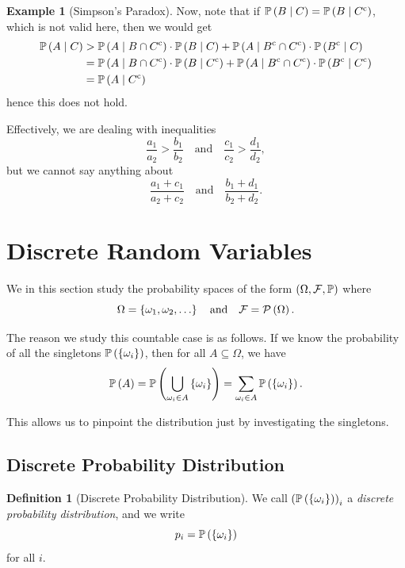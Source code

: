 \documentclass{article}
\theoremstyle{definition}
\newtheorem{definition}[theorem]{Definition}
\newtheorem{example}[theorem]{Example}
\theoremstyle{remark}
\newcommand{\Prob}{\mathbb{P}}
\newcommand{\eventSpace}{\mathcal{F}}
\newcommand{\powerset}{\mathcal{P}}
\newcommand{\Conditional}[2]{#1\mid #2}
\newcommand{\compl}{^{\mathrm{c}}}
\newcommand{\qand}{\quad\text{and}\quad}
\begin{document}
\begin{example}[Simpson's Paradox]
    Now, note that if \(\Prob\pqty{\Conditional{B}{C}} = \Prob\pqty{\Conditional{B}{C\compl}}\), which is not valid here, then we would get
    \begin{align*}
        \Prob\pqty{\Conditional{A}{C}} &> \Prob\pqty{\Conditional{A}{B \cap C\compl}} \cdot \Prob\pqty{\Conditional{B}{C}} + \Prob\pqty{\Conditional{A}{B\compl \cap C\compl}} \cdot \Prob \pqty{\Conditional{B\compl}{C}} \\
        &= \Prob\pqty{\Conditional{A}{B \cap C\compl}} \cdot \Prob\pqty{\Conditional{B}{C\compl}} + \Prob\pqty{\Conditional{A}{B\compl \cap C\compl}} \cdot \Prob \pqty{\Conditional{B\compl}{C\compl}} \\
        &= \Prob\pqty{\Conditional{A}{C\compl}}
    \end{align*}
    hence this does not hold.

    Effectively, we are dealing with inequalities
    \[
        \frac{a_1}{a_2} > \frac{b_1}{b_2} \qand \frac{c_1}{c_2} > \frac{d_1}{d_2},
    \]
    but we cannot say anything about
    \[
        \frac{a_1 + c_1}{a_2 + c_2} \qand \frac{b_1 + d_1}{b_2 + d_2}.
    \]
\end{example}

\section{Discrete Random Variables}

We in this section study the probability spaces of the form \(\pqty{\Omega, \eventSpace, \Prob}\) where
\[
    \Omega = \Bqty{\omega_1, \omega_2, \ldots} \qand \eventSpace = \powerset\pqty{\Omega}.
\]

The reason we study this countable case is as follows. If we know the probability of all the singletons \(\Prob\pqty{\Bqty{\omega_i}}\), then for all \(A \subseteq \Omega\), we have
\[
    \Prob\pqty{A} = \Prob\pqty{\bigcup_{\omega_i \in A} \Bqty{\omega_i}} = \sum_{\omega_i \in A} \Prob\pqty{\Bqty{\omega_i}}.
\]

This allows us to pinpoint the distribution just by investigating the singletons.

\subsection{Discrete Probability Distribution}

\begin{definition}[Discrete Probability Distribution]
    \label{def:discrete-probability-distribution}%
    We call \(\pqty{\Prob\pqty{\Bqty{\omega_i}}}_i\) a \emph{discrete probability distribution}, and we write
    \[
        p_i = \Prob\pqty{\Bqty{\omega_i}}
    \]
    for all \(i\).
\end{definition}
\end{document}
